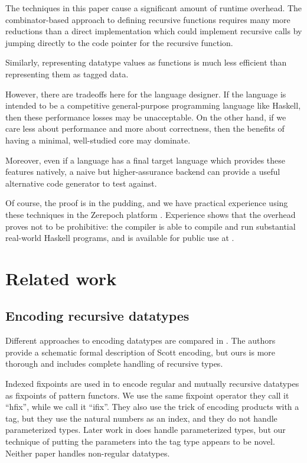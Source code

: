 The techniques in this paper cause a significant amount of runtime overhead. The
combinator-based approach to defining recursive functions requires many more
reductions than a direct implementation which could implement recursive calls
by jumping directly to the code pointer for the recursive function.

Similarly, representing datatype values as functions is much less efficient than
representing them as tagged data.

However, there are tradeoffs here for the language designer. If the language is
intended to be a competitive general-purpose programming language like Haskell,
then these performance losses may be unacceptable. On the other hand, if we care
less about performance and more about correctness, then the benefits of having a
minimal, well-studied core may dominate.

Moreover, even if a language has a final target language which
provides these features natively, a naive but higher-assurance backend can
provide a useful alternative code generator to test against.

Of course, the proof is in the pudding, and we have practical experience using
these techniques in the Zerepoch platform \cite{zerepochgithub}. Experience shows
that the overhead proves not to be prohibitive: the compiler is able to compile and run substantial
real-world Haskell programs, and is available for public use at \cite{zerepochplayground}.

\section{Related work}

\subsection{Encoding recursive datatypes}

Different approaches to encoding datatypes are compared in \cite{scott}. The
authors provide a schematic formal description of Scott encoding, but ours is
more thorough and includes complete handling of recursive types.

Indexed fixpoints are used in \cite{fixmutualgeneric} to
encode regular and mutually recursive datatypes as fixpoints of pattern
functors. We use the same fixpoint operator \textemdash{} they call it ``hfix'',
while we call it ``ifix''. They also use the trick of encoding products with a tag,
but they use the natural numbers as an index, and they do not handle
parameterized types. Later work in \cite{loh2011generic} does handle
parameterized types, but our technique of putting the parameters into the tag
type appears to be novel. Neither paper handles non-regular datatypes.

